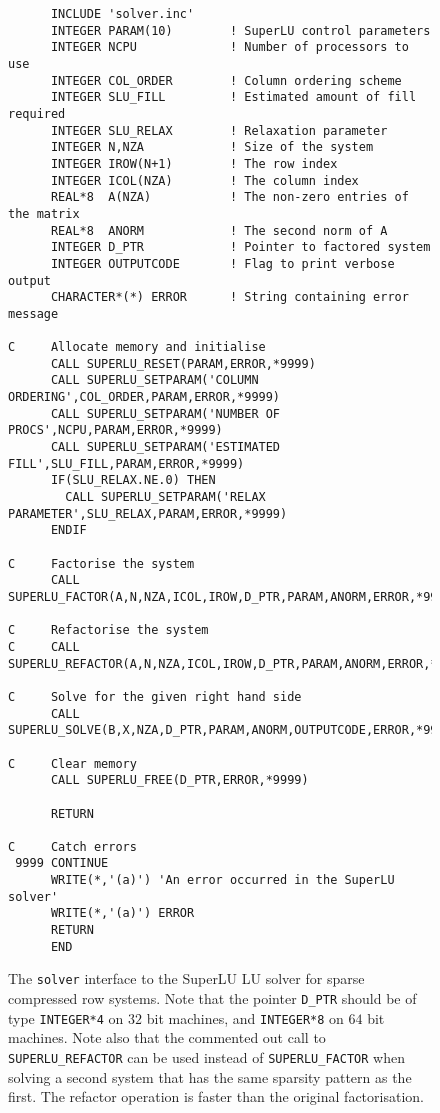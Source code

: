 \begin{figure}[htb]
\begin{small}
\begin{verbatim}
      INCLUDE 'solver.inc'
      INTEGER PARAM(10)        ! SuperLU control parameters
      INTEGER NCPU             ! Number of processors to use
      INTEGER COL_ORDER        ! Column ordering scheme
      INTEGER SLU_FILL         ! Estimated amount of fill required
      INTEGER SLU_RELAX        ! Relaxation parameter
      INTEGER N,NZA            ! Size of the system
      INTEGER IROW(N+1)        ! The row index
      INTEGER ICOL(NZA)        ! The column index
      REAL*8  A(NZA)           ! The non-zero entries of the matrix
      REAL*8  ANORM            ! The second norm of A
      INTEGER D_PTR            ! Pointer to factored system
      INTEGER OUTPUTCODE       ! Flag to print verbose output
      CHARACTER*(*) ERROR      ! String containing error message

C     Allocate memory and initialise
      CALL SUPERLU_RESET(PARAM,ERROR,*9999)
      CALL SUPERLU_SETPARAM('COLUMN ORDERING',COL_ORDER,PARAM,ERROR,*9999)
      CALL SUPERLU_SETPARAM('NUMBER OF PROCS',NCPU,PARAM,ERROR,*9999)
      CALL SUPERLU_SETPARAM('ESTIMATED FILL',SLU_FILL,PARAM,ERROR,*9999)
      IF(SLU_RELAX.NE.0) THEN
        CALL SUPERLU_SETPARAM('RELAX PARAMETER',SLU_RELAX,PARAM,ERROR,*9999)
      ENDIF

C     Factorise the system
      CALL SUPERLU_FACTOR(A,N,NZA,ICOL,IROW,D_PTR,PARAM,ANORM,ERROR,*9999)

C     Refactorise the system
C     CALL SUPERLU_REFACTOR(A,N,NZA,ICOL,IROW,D_PTR,PARAM,ANORM,ERROR,*9999)

C     Solve for the given right hand side
      CALL SUPERLU_SOLVE(B,X,NZA,D_PTR,PARAM,ANORM,OUTPUTCODE,ERROR,*9999)

C     Clear memory
      CALL SUPERLU_FREE(D_PTR,ERROR,*9999)

      RETURN

C     Catch errors
 9999 CONTINUE
      WRITE(*,'(a)') 'An error occurred in the SuperLU solver'
      WRITE(*,'(a)') ERROR
      RETURN
      END
\end{verbatim}
\end{small}
\caption{\label{f3.1} The {\tt solver} interface to the SuperLU LU
  solver for sparse compressed row systems. Note that the pointer 
  {\tt D\_PTR} should be of type {\tt INTEGER*4} on $32$ bit machines, and 
  {\tt INTEGER*8} on $64$ bit machines. Note also that the commented out call
  to {\tt SUPERLU\_REFACTOR} can be used instead of {\tt SUPERLU\_FACTOR} 
  when solving a second system that has the same sparsity pattern as the first.
  The refactor operation is faster than the original factorisation.}
\end{figure}

